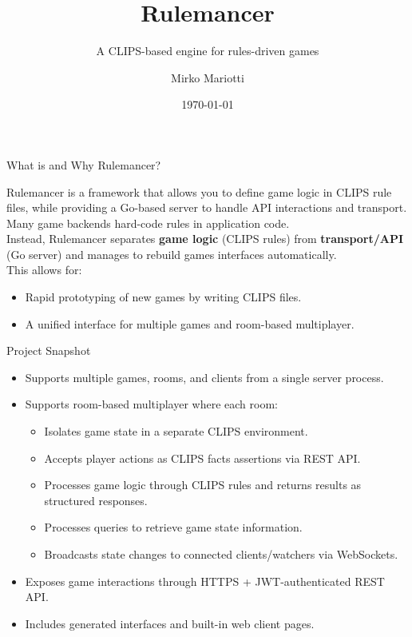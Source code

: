 \documentclass[aspectratio=169]{beamer}
\title{Rulemancer}
\subtitle{A CLIPS-based engine for rules-driven games}
\author{Mirko Mariotti}
\date{\today}
\begin{document}
\begin{frame}
  \titlepage
\end{frame}

\begin{frame}{What is and Why Rulemancer?}
\begin{center}

Rulemancer is a framework that allows you to define game logic in CLIPS rule files, while providing a Go-based server
to handle API interactions and transport. \\
\vspace{1cm}
Many game backends hard-code rules in application code. \\
Instead, Rulemancer separates \textbf{game logic} (CLIPS rules) from \textbf{transport/API} (Go server) and 
manages to rebuild games interfaces automatically. \\
\vspace{1cm}
This allows for:
\begin{itemize}
  \item Rapid prototyping of new games by writing CLIPS files.
  \item A unified interface for multiple games and room-based multiplayer.
\end{itemize}
\end{center}
\end{frame}

\begin{frame}{Project Snapshot}
\begin{itemize}
  \item Supports multiple games, rooms, and clients from a single server process.
  \vspace{0.4cm}
  \item Supports room-based multiplayer where each room:
  \vspace{0.4cm}
  \begin{itemize}
    \item Isolates game state in a separate CLIPS environment.
    \item Accepts player actions as CLIPS facts assertions via REST API.
    \item Processes game logic through CLIPS rules and returns results as structured responses.
    \item Processes queries to retrieve game state information.
    \item Broadcasts state changes to connected clients/watchers via WebSockets.
  \end{itemize}
  \vspace{0.4cm}
  \item Exposes game interactions through HTTPS + JWT-authenticated REST API.
  \vspace{0.4cm}
  \item Includes generated interfaces and built-in web client pages.
\end{itemize}
\end{frame}
\end{document}
